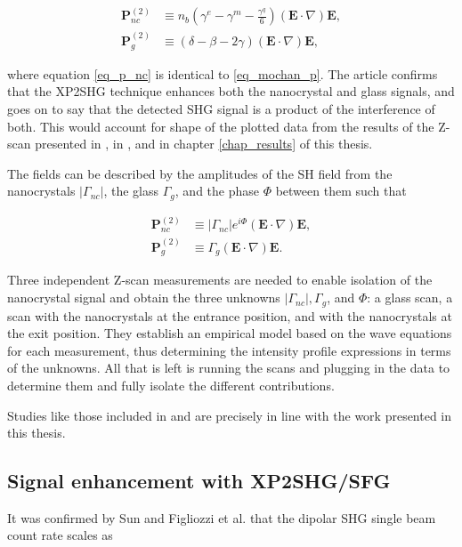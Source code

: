 \begin{align}
\mathbf{P}^{(2)}_{nc} &\equiv n_{b}\left(\gamma^{e}-\gamma^{m}-\frac{\gamma^{q}}{6}\right)\left(\mathbf{E}\cdot\nabla\right)\mathbf{E},\label{eq_p_nc}\\
\mathbf{P}^{(2)}_{g} &\equiv \left(\delta-\beta- 2\gamma\right)\left(\mathbf{E}\cdot\nabla\right)\mathbf{E},
\end{align}

where equation \eqref{eq_p_nc} is identical to \eqref{eq_mochan_p}. The article confirms that the XP2SHG technique enhances both the nanocrystal and glass signals, and goes on to say that the detected SHG signal is a product of the interference of both. This would account for shape of the plotted data from the results of the Z-scan presented in \cite{wirth2008second}, in \cite{PhysRevB.84.165316}, and in chapter \ref{chap_results} of this thesis.

The fields can be described by the amplitudes of the SH field from the nanocrystals $\vert\Gamma_{nc}\vert$, the glass $\Gamma_{g}$, and the phase $\Phi$ between them such that

\begin{align}
\mathbf{P}^{(2)}_{nc} &\equiv \vert\Gamma_{nc}\vert e^{i\Phi}\left(\mathbf{E}\cdot\nabla\right)\mathbf{E},\\
\mathbf{P}^{(2)}_{g} &\equiv \Gamma_{g}\left(\mathbf{E}\cdot\nabla\right)\mathbf{E}.
\end{align}

Three independent Z-scan measurements are needed to enable isolation of the nanocrystal signal and obtain the three unknowns $\vert\Gamma_{nc}\vert, \Gamma_{g}$, and $\Phi$: a glass scan, a scan with the nanocrystals at the entrance position, and with the nanocrystals at the exit position. They establish an empirical model based on the wave equations for each measurement, thus determining the intensity profile expressions in terms of the unknowns. All that is left is running the scans and plugging in the data to determine them and fully isolate the different contributions.

Studies like those included in \cite{PhysRevB.84.165316} and \cite{wirth2008second} are precisely in line with the work presented in this thesis.

\subsection{Signal enhancement with XP2SHG/SFG}
It was confirmed \cite{figliozzi2005single, sun2005quadrupolar} by Sun and Figliozzi et al. that the dipolar SHG single beam count rate scales as

